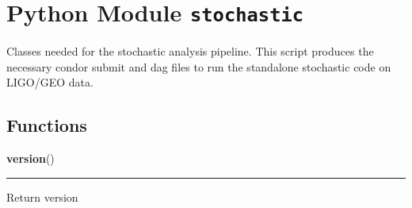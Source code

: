 %
%
%

\newenvironment{Ventry}[1]%
  {\begin{list}{}{%
    \renewcommand{\makelabel}[1]{\texttt{##1:}\hfil}%
    \settowidth{\labelwidth}{\texttt{#1:}}%
    \setlength{\leftmargin}{\labelsep}%
    \addtolength{\leftmargin}{\labelwidth}}}%
  {\end{list}}


\section{Python Module \texttt{stochastic}}

    \label{stochastic}
Classes needed for the stochastic analysis pipeline. This script produces 
the necessary condor submit and dag files to run the standalone 
stochastic code on LIGO/GEO data.



  \subsection{Functions}

    \label{stochastic:version}
    \vspace{0.5ex}

    \begin{boxedminipage}{\textwidth}

    \raggedright \textbf{version}()

    \vspace{-1.5ex}

    \rule{\textwidth}{0.5\fboxrule}
    Return version

    \vspace{1ex}

    \end{boxedminipage}



